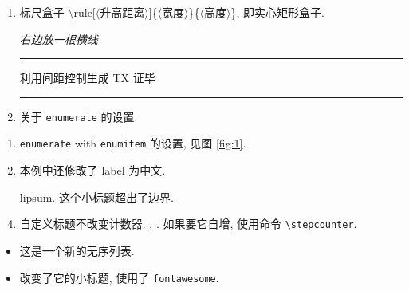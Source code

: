 \documentclass[UTF8,no-math]{ctexart}
\numberwithin{enumi}{section}
\begin{document}
\begin{enumerate}
        \item 标尺盒子 {\ttfamily\CJKsetecglue{}\textbackslash rule[$\langle$升高距离$\rangle$]\{$\langle$宽度$\rangle$\}\{$\langle$高度$\rangle$\}}, 即实心矩形盒子. \par 
        {\itshape 右边放一根横线\rule[0.7ex]{2cm}{0.6pt}\hfill 利用间距控制生成 T\hspace{-0.1667em}\hspace{-0.125em}X \hfill 证毕\rule[-0.1em]{1em}{1em}}\par 
        \item 关于 \texttt{enumerate} 的设置.
        \setcounter{tmp}{\value{enumi}}
    \end{enumerate}
    
    \begin{framed}
        \begin{enumerate}[label={\normalsize\textbf{\chinese*}.}, labelsep=1em, listparindent=2em,labelsep=1em,leftmargin=0pt, itemindent=2em]
            \item \texttt{enumerate} with \texttt{enumitem} 的设置, 见图 \ref{fig:1}. 
            \item 本例中还修改了 label 为中文. 
            \item[lipsum.] 这个小标题超出了边界.
            \item 自定义标题不改变计数器. \theenumi, . 如果要它自增, 使用命令 \verb|\stepcounter|.
        \end{enumerate}
        \begin{itemize}[label={\faHandORight}]
            \item 这是一个新的无序列表.
            \item 改变了它的小标题, 使用了 \texttt{fontawesome}.
        \end{itemize}
    \end{framed}
\end{document}
